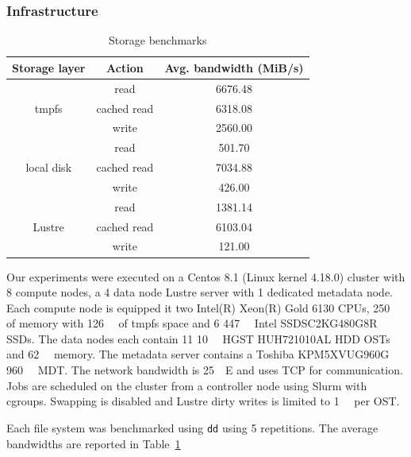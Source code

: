 \documentclass[10pt,journal,compsoc]{IEEEtran}
\begin{document}
\subsubsection{Infrastructure}
      \begin{table}
      \centering
      \begin{tabular}{@{}|c|c|c|@{}}
       \hline
       Storage layer & Action & Avg. bandwidth (MiB/s) \\
              \hline
       \multirow{3}{*}{tmpfs} & read & 6676.48 \\
       & cached read & 6318.08  \\
       & write & 2560.00 \\
       \hline
       \multirow{3}{*}{local disk} & read & 501.70  \\
       & cached read & 7034.88 \\
       & write & 426.00 \\
       \hline
       \multirow{3}{*}{Lustre} & read & 1381.14 \\
       & cached read & 6103.04  \\
       & write & 121.00  \\

       \hline

      \end{tabular}
      \caption{Storage benchmarks}
      \label{table:sea-comp:fs}
      \end{table}
            Our experiments were executed on a Centos 8.1 (Linux kernel 4.18.0)
      cluster with 8 compute nodes, a 4 data node Lustre server with 1 dedicated
      metadata node. Each compute node is equipped it two Intel(R) Xeon(R) Gold
      6130 CPUs, \SI{250}{\gibi\byte} of memory with \SI{126}{\gibi\byte} of
      tmpfs space and 6 \SI{447}{\gibi\byte} Intel SSDSC2KG480G8R SSDs. The data
      nodes each contain 11 \SI{10}{\tera\byte} HGST HUH721010AL HDD OSTs and
      \SI{62}{\gibi\byte} memory. The metadata server contains a Toshiba
      KPM5XVUG960G \SI{960}{\giga\byte} MDT. The network bandwidth is
      \SI{25}{\giga\bit}E and uses TCP for communication. Jobs are scheduled on
      the cluster from a controller node using Slurm with cgroups. Swapping is
      disabled and Lustre dirty writes is limited to \SI{1}{\giga\byte} per OST.

      Each file system was benchmarked using \texttt{dd} using 5 repetitions.
      The average bandwidths are reported in Table~\ref{table:sea-comp:fs}

\end{document}
